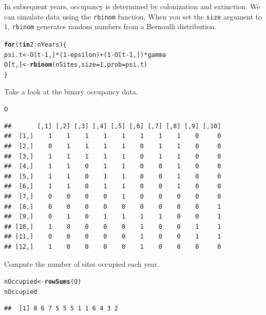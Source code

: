\documentclass[12pt]{article}\usepackage[]{graphicx}\usepackage[]{xcolor}
\makeatletter
\newcommand{\hlnum}[1]{\textcolor[rgb]{0.686,0.059,0.569}{#1}}%
\newcommand{\hlopt}[1]{\textcolor[rgb]{0,0,0}{#1}}%
\newcommand{\hldef}[1]{\textcolor[rgb]{0.345,0.345,0.345}{#1}}%
\newcommand{\hlkwa}[1]{\textcolor[rgb]{0.161,0.373,0.58}{\textbf{#1}}}%
\newcommand{\hlkwb}[1]{\textcolor[rgb]{0.69,0.353,0.396}{#1}}%
\newcommand{\hlkwc}[1]{\textcolor[rgb]{0.333,0.667,0.333}{#1}}%
\newcommand{\hlkwd}[1]{\textcolor[rgb]{0.737,0.353,0.396}{\textbf{#1}}}%
\newenvironment{kframe}{%
 \def\at@end@of@kframe{}%
 \ifinner\ifhmode%
  \def\at@end@of@kframe{\end{minipage}}%
  \begin{minipage}{\columnwidth}%
 \fi\fi%
 \def\FrameCommand##1{\hskip\@totalleftmargin \hskip-\fboxsep
 \colorbox{shadecolor}{##1}\hskip-\fboxsep
     \hskip-\linewidth \hskip-\@totalleftmargin \hskip\columnwidth}%
 \MakeFramed {\advance\hsize-\width
   \@totalleftmargin\z@ \linewidth\hsize
   \@setminipage}}%
 {\par\unskip\endMakeFramed%
 \at@end@of@kframe}
\newenvironment{knitrout}{}{} %
\makeatother
\begin{document}
In subsequent years, occupancy is determined by colonization and
extinction. We can simulate data using the {\tt rbinom}
function. When you set the {\tt size} argument to 1, {\tt rbinom}
generates random numbers from a Bernoulli distribution.
\begin{knitrout}
\color{fgcolor}\begin{kframe}
\begin{alltt}
\hlkwa{for}\hldef{(t} \hlkwa{in} \hlnum{2}\hlopt{:}\hldef{nYears) \{}
    \hldef{psi.t} \hlkwb{<-} \hldef{O[t}\hlopt{-}\hlnum{1}\hldef{,]}\hlopt{*}\hldef{(}\hlnum{1}\hlopt{-}\hldef{epsilon)} \hlopt{+} \hldef{(}\hlnum{1}\hlopt{-}\hldef{O[t}\hlopt{-}\hlnum{1}\hldef{,])}\hlopt{*}\hldef{gamma}
    \hldef{O[t,]} \hlkwb{<-} \hlkwd{rbinom}\hldef{(nSites,} \hlkwc{size}\hldef{=}\hlnum{1}\hldef{,} \hlkwc{prob}\hldef{=psi.t)}
\hldef{\}}
\end{alltt}
\end{kframe}
\end{knitrout}

Take a look at the binary occupancy data.
\begin{knitrout}
\color{fgcolor}\begin{kframe}
\begin{alltt}
\hldef{O}
\end{alltt}
\begin{verbatim}
##       [,1] [,2] [,3] [,4] [,5] [,6] [,7] [,8] [,9] [,10]
##  [1,]    1    1    1    1    1    1    1    1    0     0
##  [2,]    0    1    1    1    1    0    1    1    0     0
##  [3,]    1    1    1    1    1    0    1    1    0     0
##  [4,]    1    1    0    1    1    0    0    1    0     0
##  [5,]    1    1    0    1    1    0    0    1    0     0
##  [6,]    1    1    0    1    1    0    0    1    0     0
##  [7,]    0    0    0    0    1    0    0    0    0     0
##  [8,]    0    0    0    0    0    0    0    0    0     1
##  [9,]    0    1    0    1    1    1    1    0    0     1
## [10,]    1    0    0    0    0    1    0    0    1     1
## [11,]    0    0    0    0    0    1    0    0    1     1
## [12,]    1    0    0    0    0    1    0    0    0     0
\end{verbatim}
\end{kframe}
\end{knitrout}

Compute the number of sites occupied each year.
\begin{knitrout}
\color{fgcolor}\begin{kframe}
\begin{alltt}
\hldef{nOccupied} \hlkwb{<-} \hlkwd{rowSums}\hldef{(O)}
\hldef{nOccupied}
\end{alltt}
\begin{verbatim}
##  [1] 8 6 7 5 5 5 1 1 6 4 3 2
\end{verbatim}
\end{kframe}
\end{knitrout}
\end{document}
